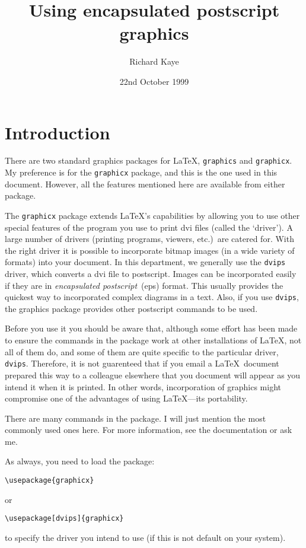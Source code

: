 \documentclass[a4paper]{article}
\title{Using encapsulated postscript graphics}
\author{Richard Kaye}
\date{22nd October 1999}
\begin{document}
\maketitle
\section{Introduction}

There are two standard graphics packages for \LaTeX,
\verb|graphics| and \verb|graphicx|.  My preference is
for the \verb|graphicx| package, and this is the one used 
in this document.  However, all the features mentioned
here are available from either package.

The \verb|graphicx| package extends \LaTeX's
capabilities by allowing you to use other special features 
of the program you use to print dvi files (called the 
`driver').  A large number of drivers (printing programs,
viewers, etc.)~are catered for. With the right
driver it is possible to incorporate bitmap images (in a wide
variety of formats) into your document.  In this department,
we generally use the \verb|dvips| driver, 
which converts a dvi file to postscript.
Images can be incorporated easily if they are in 
\textit{encapsulated postscript}~(eps) format.
This usually provides the
quickest way to incorporated complex diagrams in a text.
Also, if you use \verb|dvips|, the graphics package provides other
postscript commands to be used.  

Before you use it you should be aware that, although some
effort has been made to ensure the commands in the package
work at other installations of \LaTeX, not all of them do,
and some of them are quite specific to the particular
driver, \verb|dvips|.  Therefore, it is not guarenteed that
if you email a \LaTeX\ document prepared this way to a 
colleague elsewhere that you document will appear as you 
intend it when it is printed.  In other words, incorporation
of graphics might compromise one of the advantages of using
\LaTeX---its portability.

There are many commands in the package.  I will just mention
the most commonly used ones here.  For more information, see the
documentation or ask me.

As always, you need to load the package:
\begin{verbatim}
\usepackage{graphicx}
\end{verbatim}
or
\begin{verbatim}
\usepackage[dvips]{graphicx}
\end{verbatim}
to specify the driver you intend to use (if this is not default on your
system).
\end{document}

